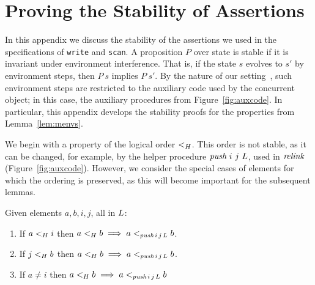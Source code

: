 \section{Proving the Stability of Assertions}
\label{sc:coq-code}

\newcommand\chainjleq[2]{\hist^{\hbox{}\sqsubseteq_{#2} {#1}}}
\newcommand\chainjltn[2]{\hist^{\hbox{}\sqsubsetneq_{#2} {#1}}}
\newcommand\chaintleq[2]{\hist^{\hbox{}\leq_{#2} {#1}}}
\def\cat{{\mathrel{+\!\!+}}}

\begin{comment}
\begin{itemize}
\item Describe stability proofs in general
\item Show Push mono Lemma in roder to justify $\tle$ not being
       stable, we will use this lemma later on
\item Present the {\sf Prefix} lemma connecting the
  $\chainjleq{t}{\ordlist}$ to $\chaintleq{t}{\ordlist}$
\item Present the {\sf Prefix} lemma connecting the
       $H^{\hbox{}\sqsubseteq_\ordlist t}$

\end{itemize}
\end{comment}

In this appendix we discuss the stability of the assertions we used in
the specifications of {\tt write} and {\tt scan}. A proposition $P$
over state is stable if it is invariant under environment
interference. That is, if the state $s$ evolves to $s'$ by environment
steps, then $P\ s$ implies $P\ s'$. By the nature of our
setting~\cite{Nanevski-al:ESOP14}, such environment steps are
restricted to the auxiliary code used by the concurrent object; in
this case, the auxiliary procedures from Figure~\ref{fig:auxcode}. In
particular, this appendix develops the stability proofs for the
properties from Lemma~\ref{lem:menvs}.

We begin with a property of the logical order $\mathrel{<_H}$. This order is
not stable, as it can be changed, for example, by the helper procedure
$\textit{push}\ i\ j\ L$, used in $\textit{relink}$
(Figure~\ref{fig:auxcode}). However, we consider the special cases of
elements for which the ordering is preserved, as this will become
important for the subsequent lemmas.



\begin{lemma}\label{lem:push-mono}
Given elements $a, b, i, j$, all in $L$:
\begin{enumerate}
\item\label{lem:push:left} If $a \mathrel{<_H} i$ then $ a \mathrel{<_H} b \implies a
  <_{\textit{push}\, i\, j\, L} b$. 
\item\label{lem:push:right} If $j \mathrel{<_H} b$ then $ a \mathrel{<_H} b \implies a
  <_{\textit{push}\, i\, j\, L} b $.
\item\label{lem:push:window} If $a \neq i$ then $ a \mathrel{<_H} b \implies a
  <_{\textit{push}\, i\, j\, L} b $
\end{enumerate}
\end{lemma}

